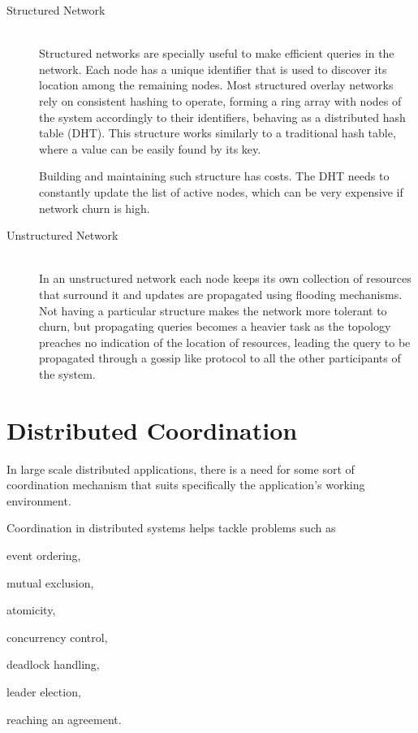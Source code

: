 \begin{description}
\item[Structured Network] \hfill \\
Structured networks are specially useful to make efficient queries in the network. Each node has a unique identifier that is used to discover its location among the remaining nodes. Most structured overlay networks rely on consistent hashing to operate, forming a ring array with nodes of the system accordingly to their identifiers, behaving as a distributed hash table (DHT). This structure works similarly to a traditional hash table, where a value can be easily found by its key.\par
	Building and maintaining such structure has costs. The DHT needs to constantly update the list of active nodes, which can be very expensive if network churn is high.

\item[Unstructured Network] \hfill \\
In an unstructured network each node keeps its own collection of resources that surround it and updates are propagated using flooding mechanisms. Not having a particular structure makes the network more tolerant to churn, but propagating queries becomes a heavier task as the topology preaches no indication of the location of resources, leading the query to be propagated through a gossip like protocol to all the other participants of the system.
\end{description}
	
\section{Distributed Coordination}
\label{sec:distributed_coordination}

In large scale distributed applications, there is a need for some sort of coordination mechanism that suits specifically the application's working environment.\par
	Coordination in distributed systems helps tackle problems such as\cite{distributed}
\begin{enumerate*}[(i)]
\item event ordering,
\item mutual exclusion,
\item atomicity,
\item concurrency control,
\item deadlock handling,
\item leader election,
\item reaching an agreement.
\end{enumerate*}


